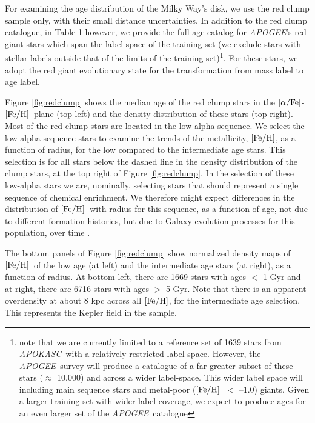 \documentclass[12pt, preprint]{aastex}
\newcommand{\project}[1]{\textsl{#1}}
\newcommand{\apogee}{\project{APOGEE}}
\newcommand{\apokasc}{\project{APOKASC}}
\newcommand{\feh}{\mbox{$\rm [Fe/H]$}}
\newcommand{\alphafe}{\mbox{$\rm [\alpha/Fe]$}}
\begin{document}
For examining the age distribution of the Milky Way's disk, we use the red clump sample only, with their small distance uncertainties. In addition to the red clump catalogue, in Table 1 however, we provide the full age catalog for \apogee's red giant stars which span the label-space of the training set (we exclude stars with stellar labels outside that of the limits of the training set)\footnote{note that we are currently limited to a reference set of 1639 stars from \apokasc\ with a relatively restricted label-space. However, the \apogee\ survey will produce a catalogue of a far greater subset of these stars ($\approx$ 10,000) and across a wider label-space. This wider label space will including main sequence stars and metal-poor (\feh\ $<$ --1.0) giants. Given a larger training set with wider label coverage, we expect to produce ages for an even larger set of the \apogee\ catalogue}. For these stars, we adopt the red giant evolutionary state for the transformation from mass label to age label. 


Figure \ref{fig:redclump} shows the median age of the red clump stars in the \alphafe-\feh\ plane (top left) and the density distribution of these stars (top right).  Most of the red clump stars are located in the low-alpha sequence. We select the low-alpha sequence stars to examine the trends of the metallicity, \feh, as a function of radius, for the low compared to the intermediate age stars. This selection is for all stars below the dashed line in the density distribution of the clump stars, at the top right of Figure \ref{fig:redclump}. In the selection of these low-alpha stars we are, nominally, selecting stars that should represent a single sequence of chemical enrichment. We therefore might expect differences in the distribution of \feh\ with radius for this sequence, as a function of age, not due to different formation histories, but due to Galaxy evolution processes for this population, over time \citep[e.g.][]{Roskar2008, Schonrich2009}. 

The bottom panels of Figure \ref{fig:redclump} show normalized density maps of \feh\ of the low age (at left) and the intermediate age stars (at right), as a function of radius. At bottom left, there are 1669 stars with ages $<$ 1 Gyr and at right, there are 6716 stars with ages $>$ 5 Gyr. Note that there is an apparent overdensity at about 8 kpc across all \feh, for the intermediate age selection. This represents the Kepler field in the sample.
\end{document}
